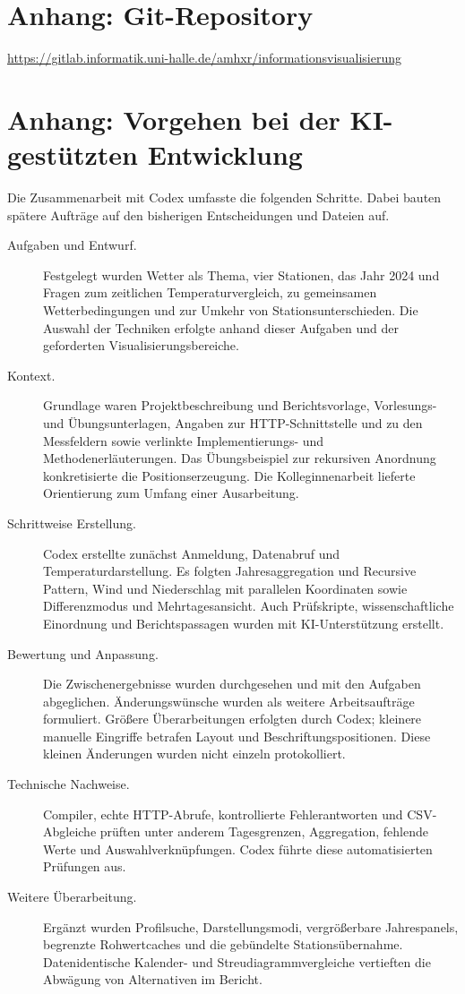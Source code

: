 \documentclass[usegeometry=true]{scrartcl}
\begin{document}
\section*{Anhang: Git-Repository}
\url{https://gitlab.informatik.uni-halle.de/amhxr/informationsvisualisierung}

\section*{Anhang: Vorgehen bei der KI-gestützten Entwicklung}
\label{app:ai-workflow}
Die Zusammenarbeit mit Codex umfasste die folgenden Schritte. Dabei
bauten spätere Aufträge auf den bisherigen Entscheidungen und Dateien auf.

\begin{description}
  \item[Aufgaben und Entwurf.]
  Festgelegt wurden Wetter als Thema, vier Stationen, das Jahr 2024 und
  Fragen zum zeitlichen Temperaturvergleich, zu gemeinsamen
  Wetterbedingungen und zur Umkehr von Stationsunterschieden.
  Die Auswahl der Techniken erfolgte anhand dieser Aufgaben und der
  geforderten Visualisierungsbereiche.
  \item[Kontext.]
  Grundlage waren Projektbeschreibung und Berichtsvorlage,
  Vorlesungs- und Übungsunterlagen, Angaben zur HTTP-Schnittstelle und
  zu den Messfeldern sowie verlinkte Implementierungs- und
  Methodenerläuterungen. Das Übungsbeispiel zur rekursiven Anordnung
  konkretisierte die Positionserzeugung. Die Kolleginnenarbeit lieferte
  Orientierung zum Umfang einer Ausarbeitung.
  \item[Schrittweise Erstellung.]
  Codex erstellte zunächst Anmeldung, Datenabruf und Temperaturdarstellung.
  Es folgten Jahresaggregation und Recursive Pattern, Wind und
  Niederschlag mit parallelen Koordinaten sowie Differenzmodus und
  Mehrtagesansicht. Auch Prüfskripte, wissenschaftliche Einordnung und
  Berichtspassagen wurden mit KI-Unterstützung erstellt.
  \item[Bewertung und Anpassung.]
  Die Zwischenergebnisse wurden durchgesehen und mit den Aufgaben
  abgeglichen. Änderungswünsche wurden als weitere Arbeitsaufträge
  formuliert. Größere Überarbeitungen erfolgten durch Codex; kleinere
  manuelle Eingriffe betrafen Layout und Beschriftungspositionen. Diese
  kleinen Änderungen wurden nicht einzeln protokolliert.
  \item[Technische Nachweise.]
  Compiler, echte HTTP-Abrufe, kontrollierte Fehlerantworten und
  CSV-Abgleiche prüften unter anderem Tagesgrenzen, Aggregation,
  fehlende Werte und Auswahlverknüpfungen. Codex führte diese automatisierten Prüfungen aus.
  \item[Weitere Überarbeitung.]
  Ergänzt wurden Profilsuche, Darstellungsmodi, vergrößerbare Jahrespanels,
  begrenzte Rohwertcaches und die gebündelte Stationsübernahme.
  Datenidentische Kalender- und Streudiagrammvergleiche vertieften die
  Abwägung von Alternativen im Bericht.
\end{description}

\printbibliography
\end{document}
